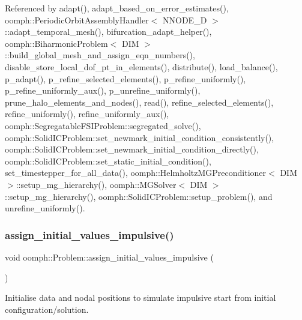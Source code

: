 Referenced by adapt(), adapt\+\_\+based\+\_\+on\+\_\+error\+\_\+estimates(), oomph\+::\+Periodic\+Orbit\+Assembly\+Handler$<$ N\+N\+O\+D\+E\+\_\+D $>$\+::adapt\+\_\+temporal\+\_\+mesh(), bifurcation\+\_\+adapt\+\_\+helper(), oomph\+::\+Biharmonic\+Problem$<$ D\+I\+M $>$\+::build\+\_\+global\+\_\+mesh\+\_\+and\+\_\+assign\+\_\+eqn\+\_\+numbers(), disable\+\_\+store\+\_\+local\+\_\+dof\+\_\+pt\+\_\+in\+\_\+elements(), distribute(), load\+\_\+balance(), p\+\_\+adapt(), p\+\_\+refine\+\_\+selected\+\_\+elements(), p\+\_\+refine\+\_\+uniformly(), p\+\_\+refine\+\_\+uniformly\+\_\+aux(), p\+\_\+unrefine\+\_\+uniformly(), prune\+\_\+halo\+\_\+elements\+\_\+and\+\_\+nodes(), read(), refine\+\_\+selected\+\_\+elements(), refine\+\_\+uniformly(), refine\+\_\+uniformly\+\_\+aux(), oomph\+::\+Segregatable\+F\+S\+I\+Problem\+::segregated\+\_\+solve(), oomph\+::\+Solid\+I\+C\+Problem\+::set\+\_\+newmark\+\_\+initial\+\_\+condition\+\_\+consistently(), oomph\+::\+Solid\+I\+C\+Problem\+::set\+\_\+newmark\+\_\+initial\+\_\+condition\+\_\+directly(), oomph\+::\+Solid\+I\+C\+Problem\+::set\+\_\+static\+\_\+initial\+\_\+condition(), set\+\_\+timestepper\+\_\+for\+\_\+all\+\_\+data(), oomph\+::\+Helmholtz\+M\+G\+Preconditioner$<$ D\+I\+M $>$\+::setup\+\_\+mg\+\_\+hierarchy(), oomph\+::\+M\+G\+Solver$<$ D\+I\+M $>$\+::setup\+\_\+mg\+\_\+hierarchy(), oomph\+::\+Solid\+I\+C\+Problem\+::setup\+\_\+problem(), and unrefine\+\_\+uniformly().

\mbox{\label{classoomph_1_1Problem_a10e5dc4d944dfb2b141918e18e5e3de8}} 
\subsubsection{\texorpdfstring{assign\+\_\+initial\+\_\+values\+\_\+impulsive()}{assign\_initial\_values\_impulsive()}\hspace{0.1cm}{\footnotesize\ttfamily [1/2]}}
{\footnotesize\ttfamily void oomph\+::\+Problem\+::assign\+\_\+initial\+\_\+values\+\_\+impulsive (\begin{DoxyParamCaption}{ }\end{DoxyParamCaption})}



Initialise data and nodal positions to simulate impulsive start from initial configuration/solution. 

